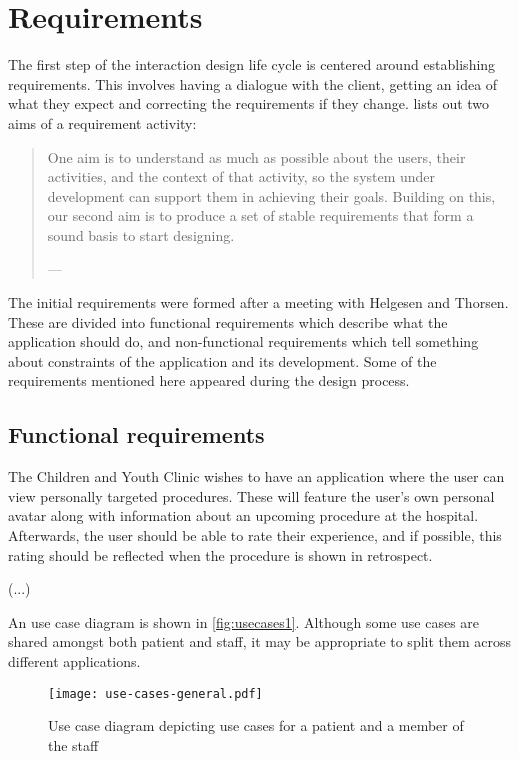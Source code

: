 \section{Requirements}
\label{sec:requirements}

The first step of the interaction design life cycle is centered around establishing requirements. This involves having a dialogue with the client, getting an idea of what they expect and correcting the requirements if they change. \textcite{preece2015} lists out two aims of a requirement activity:

\begin{quote}
    One aim is to understand as much as possible about the users, their activities, and the context of that activity, so the system under development can support them in achieving their goals. Building on this, our second aim is to produce a set of stable requirements that form a sound basis to start designing.

    \raggedleft--- \textcite{preece2015}
\end{quote}

The initial requirements were formed after a meeting with Helgesen and Thorsen. These are divided into functional requirements which describe what the application should do, and non-functional requirements which tell something about constraints of the application and its development. Some of the requirements mentioned here appeared during the design process.

\subsection{Functional requirements}

The Children and Youth Clinic wishes to have an application where the user can view personally targeted procedures. These will feature the user's own personal avatar along with information about an upcoming procedure at the hospital. Afterwards, the user should be able to rate their experience, and if possible, this rating should be reflected when the procedure is shown in retrospect.

(...)

An use case diagram is shown in \autoref{fig:usecases1}. Although some use cases are shared amongst both patient and staff, it may be appropriate to split them across different applications.

\begin{figure}
    \centering
    \texttt{[image: use-cases-general.pdf]}
    \caption{Use case diagram depicting use cases for a patient and a member of the staff}
    \label{fig:usecases1}
\end{figure}

